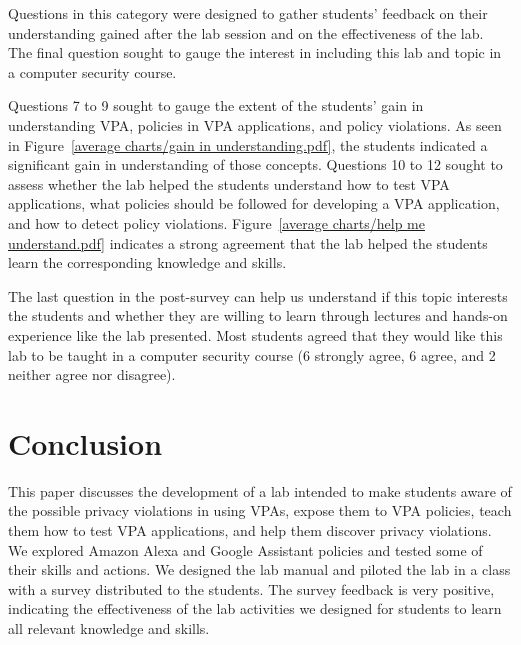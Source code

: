 \documentclass{article}
\begin{document}
Questions in this category were designed to gather students' feedback on their understanding gained after the lab session and on the effectiveness of the lab. The final question sought to gauge the interest in including this lab and topic in a computer security course. 

Questions 7 to 9 sought to gauge the extent of the students' gain in understanding VPA, policies in VPA applications, and policy violations. As seen in Figure~\ref{average charts/gain in understanding.pdf}, the students indicated a significant gain in understanding of those concepts. Questions 10 to 12 sought to assess whether the lab helped the students understand how to test VPA applications, what policies should be followed for developing a VPA application, and how to detect policy violations. Figure~\ref{average charts/help me understand.pdf} indicates a strong agreement that the lab helped the students learn the corresponding knowledge and skills.


The last question in the post-survey can help us understand if this topic interests the students and whether they are willing to learn through lectures and hands-on experience like the lab presented. Most students agreed that they would like this lab to be taught in a computer security course (6 strongly agree, 6 agree, and 2 neither agree nor disagree).



\section{Conclusion} \label{Conclusion}

This paper discusses the development of a lab intended to make students aware of the possible privacy violations in using VPAs, expose them to VPA policies, teach them how to test VPA applications, and help them discover privacy violations. We explored Amazon Alexa and Google Assistant policies and tested some of their skills and actions. %
We designed the lab manual and piloted the lab in a class with a survey distributed to the students. The survey feedback is very positive, indicating the effectiveness of the lab activities we designed for students to learn all relevant knowledge and skills. %
\end{document}
